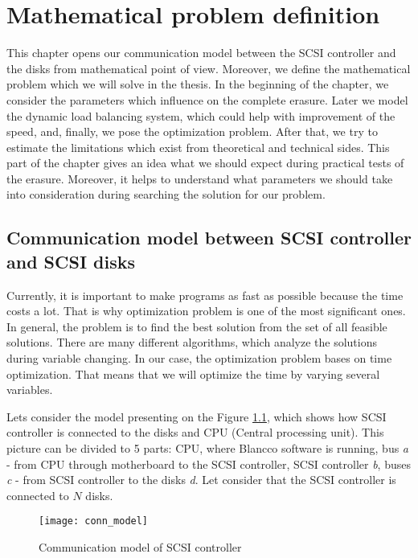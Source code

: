 \chapter{Mathematical problem definition}
\label{chap3:title}

This chapter opens our communication model between the SCSI controller and the disks from mathematical point of view. Moreover, we define the mathematical problem which we will solve in the thesis. In the beginning of the chapter, we consider the parameters which influence on the complete erasure. Later we model the dynamic load balancing system, which could help with improvement of the speed, and, finally, we pose the optimization problem. After that, we try to estimate the limitations which exist from theoretical and technical sides. This part of the chapter gives an idea what we should expect during practical tests of the erasure. Moreover, it helps to understand what parameters we should take into consideration during searching the solution for our problem.

\newpage
\section{Communication model between SCSI controller and SCSI disks}
Currently, it is important to make programs as fast as possible because the time costs a lot. That is why optimization problem is one of the most significant ones. In general, the problem is to find the best solution from the set of all feasible solutions. There are many different algorithms, which analyze the solutions during variable changing. In our case, the optimization problem bases on time optimization. That means that we will optimize the time by varying several variables.

Lets consider the model presenting on the Figure \ref{fig:conn_model}, which shows how SCSI controller is connected to the disks and CPU (Central processing unit). This picture can be divided to 5 parts: CPU, where Blancco software is running, bus \emph{a} - from CPU through motherboard to the SCSI controller, SCSI controller \emph{b}, buses \emph{c} - from SCSI controller to the disks \emph{d}. Let consider that the SCSI controller is connected to $N$ disks.

\begin{figure}[h]
\begin{center}
  \texttt{[image: conn\_model]}
\end{center}
  \caption{Communication model of SCSI controller}
  \label{fig:conn_model}
\end{figure}

